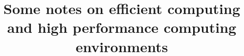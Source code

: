 

\title[]{Some notes on efficient computing and high performance computing environments}




\maketitle

%
%
